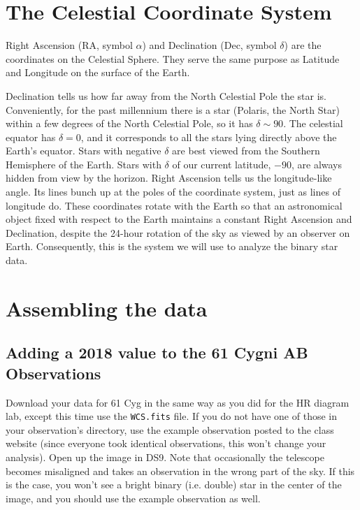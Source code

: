 \section{The Celestial Coordinate System}

Right Ascension (RA, symbol $\alpha$) and Declination (Dec, symbol $\delta$) are the coordinates on the Celestial Sphere.  They serve the same purpose as Latitude and Longitude on the surface of the Earth.  

Declination tells us how far away from the North Celestial Pole the star is.  Conveniently, for the past millennium there is a star (Polaris, the North Star) within a few degrees of the North Celestial Pole, so it has $\delta \sim 90$\textdegree.  The celestial equator has $\delta = 0$\textdegree, and it corresponds to all the stars lying directly above the Earth’s equator. Stars with negative $\delta$ are best viewed from the Southern Hemisphere of the Earth.  Stars with $\delta$ of our current latitude, $-90$\textdegree, are always hidden from view by the horizon. Right Ascension tells us the longitude-like angle.  Its lines bunch up at the poles of the coordinate system, just as lines of longitude do. These coordinates rotate with the Earth so that an astronomical object fixed with respect to the Earth maintains a constant Right Ascension and Declination, despite the 24-hour rotation of the sky as viewed by an observer on Earth. Consequently, this is the system we will use to analyze the binary star data.

\section{Assembling the data}
\subsection{Adding a 2018 value to the 61 Cygni AB Observations}

Download your data for 61 Cyg in the same way as you did for the HR diagram lab, except this time use the \texttt{WCS.fits} file. If you do not have one of those in your observation's directory, use the example observation posted to the class website (since everyone took identical observations, this won't change your analysis). Open up the image in DS9. Note that occasionally the telescope becomes misaligned and takes an observation in the wrong part of the sky. If this is the case, you won't see a bright binary (i.e. double) star in the center of the image, and you should use the example observation as well. 

